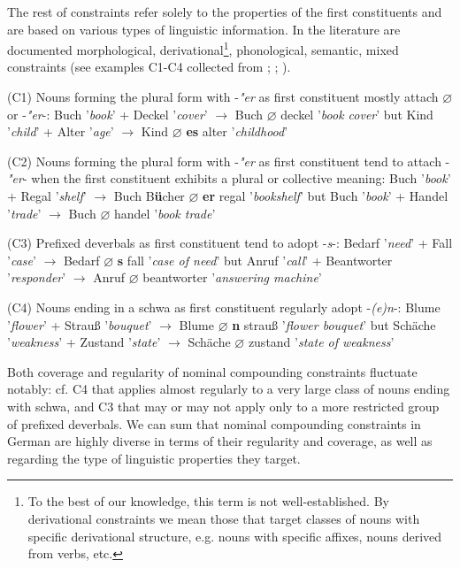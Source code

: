 \documentclass[10pt, a4paper]{article}
\newcommand{\zeroLinker}{\ensuremath{\boldsymbol{\varnothing}}}
\newcommand{\compEx}[7]{%
    #1 '\textit{#2}' + #4 '\textit{#5}'
    $\rightarrow$
    \if\relax\detokenize{#6}\relax
      #1%
    \else
      #6%
    \fi
    \if\relax\detokenize{#3}\relax
      \zeroLinker%
    \else
      \textbf{#3}%
    \fi
    \MakeLowercase{#4} '\textit{#7}'%
}
\begin{document}
The rest of constraints refer solely to the properties of the first constituents and are based on various types of linguistic information. In the literature are documented morphological, derivational\footnote{To the best of our knowledge, this term is not well-established. By derivational constraints we mean those that target classes of nouns with specific derivational structure, e.g. nouns with specific affixes, nouns derived from verbs, etc.}, phonological, semantic, mixed constraints (see examples C1-C4 collected from \citealp[228-230]{eisenberg_2013}; \citealp{libben_etal_2009}; \citealp{nuebling_szczepaniak_2013}).

\begin{tcolorbox}[breakable]

    (C1) Nouns forming the plural form with -\textit{"er} as first constituent mostly attach \zeroLinker or -\textit{"er}-: \compEx{Buch}{book}{}{Deckel}{cover}{}{book cover} but \compEx{Kind}{child}{es}{Alter}{age}{}{childhood}

    \vspace{0.5em}

    (C2) Nouns forming the plural form with -\textit{"er} as first constituent tend to attach -\textit{"er}- when the first constituent exhibits a plural or collective meaning: \compEx{Buch}{book}{er}{Regal}{shelf}{B\textbf{ü}cher}{bookshelf} but \compEx{Buch}{book}{}{Handel}{trade}{}{book trade}

    \vspace{0.5em}

    (C3) Prefixed deverbals as first constituent tend to adopt -\textit{s}-: \compEx{Bedarf}{need}{s}{Fall}{case}{}{case of need} but \compEx{Anruf}{call}{}{Beantworter}{responder}{}{answering machine}

    \vspace{0.5em}
    
    (C4) Nouns ending in a schwa as first constituent regularly adopt -\textit{(e)n}-: \compEx{Blume}{flower}{n}{Strauß}{bouquet}{}{flower bouquet} but \compEx{Schäche}{weakness}{}{Zustand}{state}{}{state of weakness}
        
\end{tcolorbox}

Both coverage and regularity of nominal compounding constraints fluctuate notably: cf. C4 that applies almost regularly to a very large class of nouns ending with schwa, and C3 that may or may not apply only to a more restricted group of prefixed deverbals. We can sum that nominal compounding constraints in German are highly diverse in terms of their regularity and coverage, as well as regarding the type of linguistic properties they target.
\end{document}
